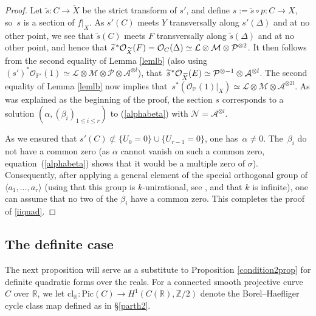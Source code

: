 \documentclass{amsart}
\theoremstyle{definition}
\theoremstyle{remark}
\numberwithin{equation}{section}
\newcommand{\cl}{\mathrm{cl}}
\newcommand{\Pic}{\mathrm{Pic}}
\def\Z{\mathbb Z}
\def\P{\mathbb P}
\def\R{\mathbb R}
\def\cA{\mathcal{A}}
\def\cN{\mathcal{N}}
\def\cM{\mathcal{M}}
\def\cL{\mathcal{L}}
\def\cO{\mathcal{O}}
\def\cM{\mathcal{M}}
\def\cP{\mathcal{P}}
\def\wX{\widetilde{X}}
\def\ws{\widetilde{s}}
\begin{document}
\begin{proof}
Let $\ws:C\to\wX$ be the strict transform of $s'$, and define $s:=\ws\circ p:C\to X$, so~$s$ is a section of $f|_X$. As $s'(C)$ meets $Y$ transversally along $s'(\Delta)$ and at no other point, we see that $\ws(C)$ meets $F$  transversally along $\ws(\Delta)$ and at no other point, and hence that
$\ws\hspace{.09em}^*\cO_{\wX}(F)=\cO_C(\Delta)\simeq\cL\otimes\cM\otimes\cP^{\otimes 2}$. It then follows from the second equality of Lemma \ref{lemlb} (also using $(s')^*\cO_{\P'}(1)\simeq\cL\otimes \cM\otimes \cP\otimes \cA^{\otimes l}$), that~$\ws\hspace{.09em}^*\cO_{\wX}(E)\simeq\cP^{\otimes -1}\otimes\cA^{\otimes l}$. The second equality of Lemma \ref{lemlb} now implies that~$s^*(\cO_{\P}(1)|_X)\simeq\cL\otimes\cM\otimes\cA^{\otimes 2l}$. As was explained as the beginning of the proof, the section $s$ corresponds to a solution $(\alpha, (\beta_i)_{1\leq i\leq r})$ to (\ref{alphabeta}) with $\cN=\cA^{\otimes l}$.

As we ensured that  $s'(C)\not\subset\{U_0=0\}\cup\{U_{r-1}=0\}$, one has~$\alpha\neq 0$.  The~$\beta_i$ do not have a common zero (as $\alpha$ cannot vanish on such a common zero, equation~(\ref{alphabeta}) shows that it would be a multiple zero of $\sigma$).
Consequently, after applying a general element of the special orthogonal group of $\langle a_1,\dots, a_{r}\rangle$ (using that this group is $k$\nobreakdash-unirational, see \cite[V, Theorem 18.2]{Borel}, and that $k$ is infinite), one can assume that no two of the $\beta_i$ have a common zero. This completes the proof of \ref{iiquad}.
\end{proof}


\subsection{The definite case}

The next proposition will serve as a substitute to Proposition \ref{condition2prop} for definite quadratic forms over the reals. For a connected smooth projective curve $C$ over $\R$, we let $\cl_{\R}:\Pic(C)\to H^1(C(\R),\Z/2)$ denote the Borel--Haefliger cycle class map defined as in \S\ref{parth2}.
\end{document}
